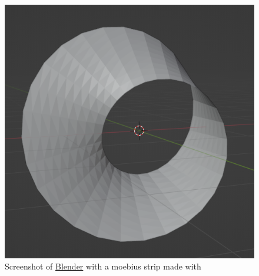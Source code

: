\begin{figure}[ht]
    \centering
    \includegraphics[scale=0.35]{img/moebius_2023-05-23.png}
    \caption{Screenshot of \href{https://www.blender.org/}{Blender} with a moebius strip made with \maniflow{}}
    \label{fig:moubius_blender}
\end{figure}
